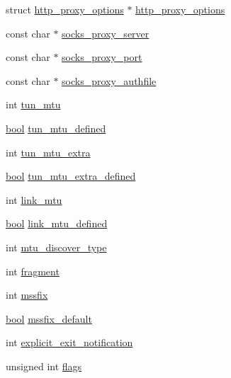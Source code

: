 \begin{DoxyCompactItemize}
\item 
struct \hyperlink{structhttp__proxy__options}{http\+\_\+proxy\+\_\+options} $\ast$ \hyperlink{structconnection__entry_a70c458a2aee1a9b085b2bc05281722e6}{http\+\_\+proxy\+\_\+options}
\item 
const char $\ast$ \hyperlink{structconnection__entry_aacc02906ca3f2d2be9f28171bcd60452}{socks\+\_\+proxy\+\_\+server}
\item 
const char $\ast$ \hyperlink{structconnection__entry_a524bd17937bd36d74874af04eef7f131}{socks\+\_\+proxy\+\_\+port}
\item 
const char $\ast$ \hyperlink{structconnection__entry_a9f38a4424c365c8c9cb23f12f1b74806}{socks\+\_\+proxy\+\_\+authfile}
\item 
int \hyperlink{structconnection__entry_acd8706781548bd6e51c6a43b9a457155}{tun\+\_\+mtu}
\item 
\hyperlink{automatic_8c_abb452686968e48b67397da5f97445f5b}{bool} \hyperlink{structconnection__entry_a90482e8f2d1ab61167f705cec826abee}{tun\+\_\+mtu\+\_\+defined}
\item 
int \hyperlink{structconnection__entry_a1bdd5db16d783c90714bcf5c9ae1cdf6}{tun\+\_\+mtu\+\_\+extra}
\item 
\hyperlink{automatic_8c_abb452686968e48b67397da5f97445f5b}{bool} \hyperlink{structconnection__entry_a3d3ab06697dbc44a288e6f07b0bdbf3a}{tun\+\_\+mtu\+\_\+extra\+\_\+defined}
\item 
int \hyperlink{structconnection__entry_a08f0f18740ef4f00f130df8ce3a6c672}{link\+\_\+mtu}
\item 
\hyperlink{automatic_8c_abb452686968e48b67397da5f97445f5b}{bool} \hyperlink{structconnection__entry_a12ae06d792bd8aed58475b9976673654}{link\+\_\+mtu\+\_\+defined}
\item 
int \hyperlink{structconnection__entry_aba4ccef71abd388a80a607ab3da381e4}{mtu\+\_\+discover\+\_\+type}
\item 
int \hyperlink{structconnection__entry_ab003130b974deb481133d4209f74b25c}{fragment}
\item 
int \hyperlink{structconnection__entry_a27a04bbbad750c17bbdee216e6a0aacd}{mssfix}
\item 
\hyperlink{automatic_8c_abb452686968e48b67397da5f97445f5b}{bool} \hyperlink{structconnection__entry_a576ce2725c6c63f647185d78b91f8604}{mssfix\+\_\+default}
\item 
int \hyperlink{structconnection__entry_a9adab10d5a021e6f453ebc4edc29ecde}{explicit\+\_\+exit\+\_\+notification}
\item 
unsigned int \hyperlink{structconnection__entry_afba71f06b2a1c865bb1f142a8dbdbb2d}{flags}
\end{DoxyCompactItemize}


